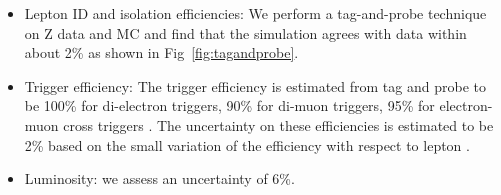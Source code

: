 \begin{itemize}
\item Lepton ID and isolation efficiencies: 
  We perform a tag-and-probe technique
  on Z data and MC and find that the simulation agrees with data within about 2\% as shown 
  in Fig~\ref{fig:tagandprobe}.

\item Trigger efficiency: 
  The trigger efficiency is estimated from tag and probe to be 
  100\% for di-electron triggers,
  90\% for di-muon triggers,
  95\% for electron-muon cross triggers \cite{ref:smurfww}. 
  The uncertainty on these efficiencies is estimated to be 2\% based on the small variation of the efficiency
  with respect to lepton \pt.

\item Luminosity: we assess an uncertainty of 6\%.

\end{itemize}


